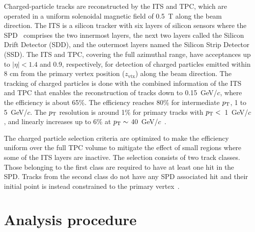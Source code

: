 Charged-particle tracks are reconstructed by the ITS and TPC, which are operated in a uniform solenoidal magnetic field of 0.5~T along the beam direction. The ITS is a silicon tracker with six layers of silicon sensors where the SPD~\cite{Santoro2009:ALICESPD} comprises the two innermost layers, the next two layers called the Silicon Drift Detector (SDD), and the outermost layers named the Silicon Strip Detector (SSD). The ITS and TPC, covering the full azimuthal range, have acceptances up to $|\eta| < 1.4$ and 0.9, respectively, for detection of charged particles emitted within 8 cm from the primary vertex position ($z_\mathrm{vtx}$) along the beam direction. The tracking of charged particles is done with the combined information of the ITS and TPC that enables the reconstruction of tracks down to 0.15~GeV/$c$, where the efficiency is about 65\%. The efficiency reaches 80\% for intermediate $p_\mathrm{T}$, 1 to 5~GeV/$c$. The $p_\mathrm{T}$ resolution is around 1\% for primary tracks with $p_\mathrm{T}<$~1~GeV/$c$, and linearly increases up to 6\% at $p_\mathrm{T} \sim$ 40~GeV/$c$~\cite{Contin_2012:ITSPTRES}.

The charged particle selection criteria are optimized to make the efficiency uniform over the full TPC volume to mitigate the effect of small regions where some of the ITS layers are inactive. The selection consists of two track classes. Those belonging to the first class are required to have at least one hit in the SPD. Tracks from the second class do not have any SPD associated hit and their initial point is instead constrained to the primary vertex~\cite{Adam:2015ewa}.


\section{Analysis procedure}
\label{sec:ana}

